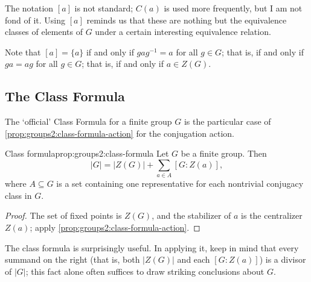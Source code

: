 The notation $[a]$ is not standard; $C(a)$ is used more frequently,
but I am not fond of it. Using $[a]$ reminds us that these are nothing
but the equivalence classes of elements of $G$ under a certain
interesting equivalence relation.

Note that $[a] = \{a\}$ if and only if $gag^{-1} = a$ for all
$g \in G$; that is, if and only if $ga = ag$ for all $g \in G$; that
is, if and only if $a \in Z(G)$.

\subsection{The Class Formula}
\label{subsec:groups2:the-class-formula}
The `official' Class Formula for a finite group $G$ is the particular
case of \cref{prop:groups2:class-formula-action} for the conjugation
action.

\begin{prop}{Class formula}{prop:groups2:class-formula}
  Let $G$ be a finite group. Then
  \[
    |G| = |Z(G)| + \sum_{a \in A} [G : Z(a)],
  \]
  where $A \subseteq G$ is a set containing one representative for
  each nontrivial conjugacy class in $G$.
\end{prop}
\begin{proof}
  The set of fixed points is $Z(G)$, and the stabilizer of $a$ is the
  centralizer $Z(a)$; apply \cref{prop:groups2:class-formula-action}.
\end{proof}
The class formula is surprisingly useful. In applying it, keep in mind
that every summand on the right (that is, both $|Z(G)|$ and each
$[G : Z(a)]$) is a divisor of $|G|$; this fact alone often suffices to
draw striking conclusions about $G$.

